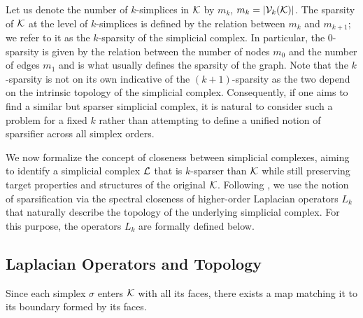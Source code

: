 Let us denote the number of \( k \)-simplices in \( \mathcal{K}\) by \( m_k\), \( m_k = | \mathcal{V}_{k}(\mathcal{K}) | \). The sparsity of $\mathcal{K}$ at the level of \( k\)-simplices is defined by the relation between \( m_k \) and \( m_{k+1}\); we refer to it as the \( k \)-sparsity of the simplicial complex. In particular, the \( 0 \)-sparsity is given by the relation between the number of nodes \( m_0 \) and the number of edges \( m_1 \) and is what usually defines the sparsity of the graph. Note that the \( k \)-sparsity is not on its own indicative of the \( ( k + 1 ) \)-sparsity as the two depend on the intrinsic topology of the simplicial complex. Consequently, if one aims to find a similar but sparser simplicial complex, it is natural to consider such a problem for a fixed \( k \) rather than attempting to define a unified notion of sparsifier across all simplex orders.

We now formalize the concept of closeness between simplicial complexes, aiming to identify a simplicial complex \(\mathcal{L} \) that is \(k\)-sparser than \( \mathcal{K} \) while still preserving target properties and structures of the original $\mathcal{K}$. 
Following \cite{spielman2008graph, osting2017spectral}, we use the notion of sparsification via the spectral closeness of higher-order Laplacian operators \( L_k \)
that naturally describe the topology of the underlying simplicial complex. For this purpose, the operators \( L_k \) are formally defined below.






\subsection{Laplacian Operators and Topology}

Since each simplex \( \sigma \) enters \( \mathcal{K} \) with all its faces, there exists a map matching it to its boundary formed by its faces.



